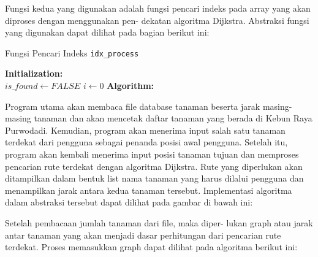 \documentclass[conference]{IEEEtran}
\begin{document}
    Fungsi kedua yang digunakan adalah fungsi pencari indeks
    pada  array  yang  akan  diproses  dengan  menggunakan  pen-
    dekatan  algoritma  Dijkstra.  Abstraksi  fungsi  yang  digunakan
    dapat dilihat pada bagian berikut ini:\par

    \begin{algorithm}
        \SetAlgoLined
        \DontPrintSemicolon
        \caption{Fungsi Pencari Indeks \texttt{idx\_process}}
        \textbf{Initialization:}\\
        $is\_found \gets FALSE$\;
        $i \gets 0$\;
        \textbf{Algorithm:}\\
    \end{algorithm}
    
    Program   utama   akan   membaca   file   database   tanaman
    beserta  jarak  masing-masing  tanaman  dan  akan  mencetak
    daftar   tanaman   yang   berada   di   Kebun   Raya   Purwodadi.
    Kemudian, program akan menerima input salah satu tanaman
    terdekat dari pengguna sebagai penanda posisi awal pengguna.
    Setelah  itu,  program  akan  kembali  menerima  input  posisi
    tanaman tujuan dan memproses pencarian rute terdekat dengan
    algoritma  Dijkstra.  Rute  yang  diperlukan  akan  ditampilkan
    dalam bentuk list nama tanaman yang harus dilalui pengguna
    dan   menampilkan   jarak   antara   kedua   tanaman   tersebut.
    Implementasi algoritma dalam abstraksi tersebut dapat dilihat
    pada gambar di bawah ini:\par

    Setelah  pembacaan  jumlah  tanaman  dari  file,  maka  diper-
    lukan graph atau jarak antar tanaman yang akan menjadi dasar
    perhitungan dari pencarian rute terdekat. Proses memasukkan
    graph dapat dilihat pada algoritma berikut ini:\par
\end{document}
